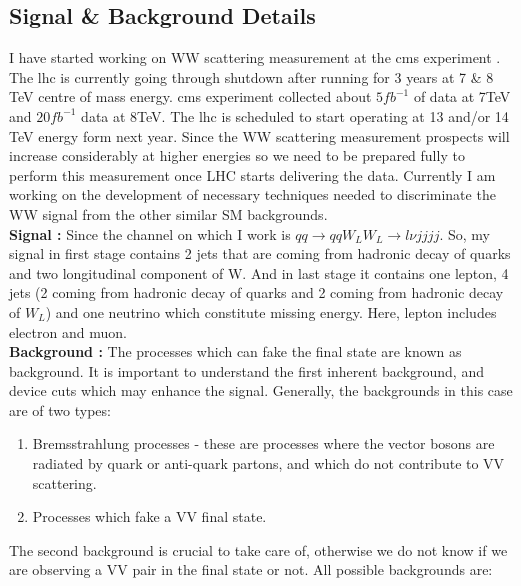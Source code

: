 \subsection{Signal \& Background Details}
I have started working on WW scattering measurement at the {cms} experiment \cite{paper:JINST:CMSCollaboration}. The {lhc} is currently going through shutdown after running for 3 years at 7 \& 8 TeV centre of mass energy. {cms} experiment collected about $5fb^{-1}$ of data at 7TeV and $20fb^{-1}$ data at 8TeV. The {lhc} is scheduled to start operating at 13 and/or 14 TeV energy form next year. Since the WW scattering measurement prospects will increase considerably at higher energies so we need to be prepared fully to perform this measurement once LHC starts delivering the data. Currently I am working on the development of necessary techniques needed to discriminate the WW signal from the other similar SM backgrounds.\\ {\large \bf Signal :} Since the channel on which I work is $qq\rightarrow qqW_LW_L \rightarrow l\nu jjjj$. So, my signal in first stage contains 2 jets that are coming from hadronic decay of quarks and two longitudinal component of W. And in last stage it contains one lepton, 4 jets (2 coming from hadronic decay of quarks and 2 coming from hadronic decay of $W_L$) and one neutrino which constitute missing energy. Here, lepton includes electron and muon.\\{\large \bf Background :} The processes which can fake the final state are known as background. It is important to understand the first inherent background, and device cuts which may enhance the signal. Generally, the backgrounds in this case are of two types:
\begin{enumerate}
	\item Bremsstrahlung processes - these are processes where the vector bosons are radiated by quark or anti-quark partons, and which do not contribute to VV scattering.
	\item Processes which fake a VV final state.
\end{enumerate}
 The second background is crucial to take care of, otherwise we do not know if we are observing a VV pair in the final state or not.
All possible backgrounds are:
